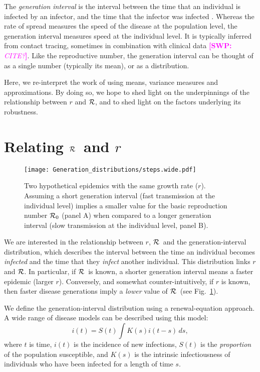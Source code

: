 \documentclass[12pt,]{article}
\newcommand{\RR}{\ensuremath{{\cal R}}}
\newcommand{\Rx}[1]{\ensuremath{{\cal R}_{#1}}}
\newcommand{\Ro}{\Rx{0}}
\newcommand{\fref}[1]{Fig.~\ref{fig:#1}}
\newcommand{\comment}[3]{\textcolor{#1}{\textbf{[#2: }\textit{#3}\textbf{]}}}
\newcommand{\swp}[1]{\comment{magenta}{SWP}{#1}}
\begin{document}
The \emph{generation interval} is the interval between the time that an individual is infected by an infector, and the time that the infector was infected \cite{Sven07}.
Whereas the rate of spread measures the speed of the disease at the population level, the generation interval measures speed at the individual level.
It is typically inferred from contact tracing, sometimes in combination with clinical data \swp{CITE?}.
Like the reproductive number, the generation interval can be thought of as a single number (typically its mean), or as a distribution.

Here, we re-interpret the work of \cite{WallLips07} using means, variance measures and approximations.
By doing so, we hope to shed light on the underpinnings of the relationship between $r$ and \RR, and to shed light on the factors underlying its robustness.

\section{Relating \RR\ and $r$}

\begin{figure}[htbp] \centering
	\texttt{[image: Generation\_distributions/steps.wide.pdf]}
	\caption{Two hypothetical epidemics with the same growth rate ($r$).  Assuming a short generation interval (fast transmission at the individual level) implies a smaller value for the basic reproduction number $\Ro$ (panel A) when compared to a longer generation interval (slow transmission at the individual level, panel B).
	\label{fig:link}}
\end{figure}

We are interested in the relationship between $r$, \RR~and the generation-interval distribution, which describes the interval between the time an individual becomes \emph{infected} and the time that they \emph{infect} another individual.
This distribution links $r$ and \RR. In particular, if \RR~is known, a shorter generation interval means a faster epidemic (larger $r$). Conversely, and somewhat counter-intuitively, if $r$ is known, then faster disease generations imply a \emph{lower} value of \RR~(see \fref{link}).

We define the generation-interval distribution using a renewal-equation approach.
A wide range of disease models can be described using this model: $$i(t) = S(t)\int{K(s)i(t-s) \,ds},$$ where $t$ is time, $i(t)$ is the incidence of new infections, $S(t)$ is the \emph{proportion} of the population susceptible, and $K(s)$ is the intrinsic infectiousness of individuals who have been infected for a length of time $s$.
\end{document}
